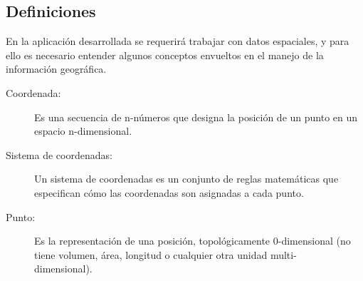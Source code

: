   \subsection{Definiciones} %
  \label{sub:definiciones}

    En la aplicación desarrollada se requerirá trabajar con datos espaciales, y para ello es necesario entender algunos conceptos envueltos en el manejo de la información geográfica.

    \begin{description}
      \item[Coordenada:] Es una secuencia de n-números que designa la posición de un punto en un espacio n-dimensional. \\
      \item[Sistema de coordenadas:] Un sistema de coordenadas es  un conjunto de reglas matemáticas que especifican cómo las coordenadas son asignadas  a cada  punto.
      \item[Punto:] Es  la representación de una posición, topológicamente 0-dimensional (no tiene volumen, área, longitud o cualquier otra unidad multi-\\dimensional).
    \end{description}





